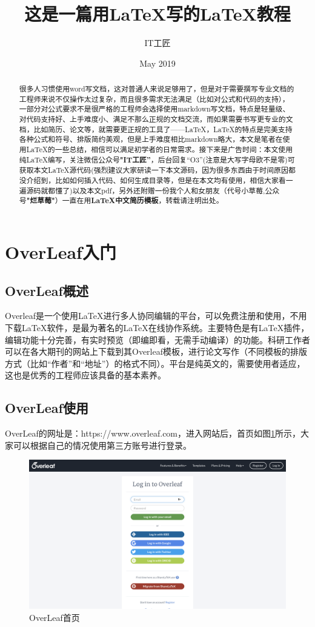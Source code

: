 \documentclass{article}
\title{这是一篇用LaTeX写的LaTeX教程}
\author{IT工匠}
\date{May 2019}
\begin{document}
\maketitle
\begin{abstract}
    很多人习惯使用word写文档，这对普通人来说足够用了，但是对于需要撰写专业文档的工程师来说不仅操作太过复杂，而且很多需求无法满足（比如对公式和代码的支持），一部分对公式要求不是很严格的工程师会选择使用markdown写文档，特点是轻量级、对代码支持好、上手难度小、满足不那么正规的文档交流，而如果需要书写更专业的文档，比如简历、论文等，就需要更正规的工具了——LaTeX，LaTeX的特点是完美支持各种公式和符号、排版简约美观，但是上手难度相比markdown略大，本文是笔者在使用LaTeX的一些总结，相信可以满足初学者的日常需求。接下来是广告时间：本文使用纯LaTeX编写，关注微信公众号\textbf{"IT工匠”}，后台回复“O3”(注意是大写字母欧不是零)可获取本文LaTeX源代码(强烈建议大家研读一下本文源码，因为很多东西由于时间原因都没介绍到，比如如何插入代码、如何生成目录等，但是在本文均有使用，相信大家看一遍源码就都懂了)以及本文pdf，另外还附赠一份我个人和女朋友（代号小草莓,公众号\textbf{"烂草莓"}）一直在用\textbf{LaTeX中文简历模板}，转载请注明出处。
\end{abstract}
\newpage
\tableofcontents

\section{OverLeaf入门}
\subsection{OverLeaf概述}
Overleaf是一个使用LaTeX进行多人协同编辑的平台，可以免费注册和使用，不用下载LaTeX软件，是最为著名的LaTeX在线协作系统。主要特色是有LaTeX插件，编辑功能十分完善，有实时预览（即编即看，无需手动编译）的功能。科研工作者可以在各大期刊的网站上下载到其Overleaf模板，进行论文写作（不同模板的排版方式（比如“作者”和“地址”）的格式不同）。平台是纯英文的，需要使用者适应，这也是优秀的工程师应该具备的基本素养。
\subsection{OverLeaf使用}
OverLeaf的网址是：https://www.overleaf.com，进入网站后，首页如图\ref{overleaf-main-page}所示，大家可以根据自己的情况使用第三方账号进行登录。

\begin{figure}[H] 
\centering
\includegraphics[width=1\textwidth]{overleaf首页.png}
\caption{OverLeaf首页}
\label{overleaf-main-page}
\end{figure}
\end{document}
